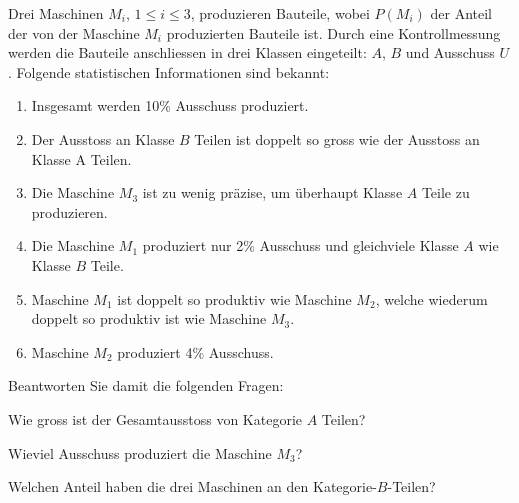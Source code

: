 Drei Maschinen $M_i$, $1\le i\le 3$, produzieren Bauteile, wobei $P(M_i)$
der Anteil der von der Maschine $M_i$ produzierten Bauteile ist.
Durch eine Kontrollmessung werden die Bauteile anschliessen in
drei Klassen eingeteilt: $A$, $B$ und Ausschuss $U$. Folgende statistischen
Informationen sind bekannt:
\begin{enumerate}
\item Insgesamt werden 10\% Ausschuss produziert.
\item Der Ausstoss an Klasse $B$ Teilen ist doppelt so gross wie
der Ausstoss an Klasse A Teilen.
\item Die Maschine $M_3$ ist zu wenig präzise, um überhaupt
Klasse $A$ Teile zu produzieren.
\item Die Maschine $M_1$ produziert nur 2\% Ausschuss und gleichviele
Klasse $A$ wie Klasse $B$ Teile.
\item Maschine $M_1$ ist doppelt so produktiv wie Maschine $M_2$, welche
wiederum doppelt so produktiv ist wie Maschine $M_3$.
\item Maschine $M_2$ produziert 4\% Ausschuss.
\end{enumerate}
Beantworten Sie damit die folgenden Fragen:
\begin{teilaufgaben}
\item
Wie gross ist der Gesamtausstoss von Kategorie $A$ Teilen?
\item
Wieviel Ausschuss produziert die Maschine $M_3$?
\item
Welchen Anteil haben die drei Maschinen an den Kategorie-$B$-Teilen?
\end{teilaufgaben}


